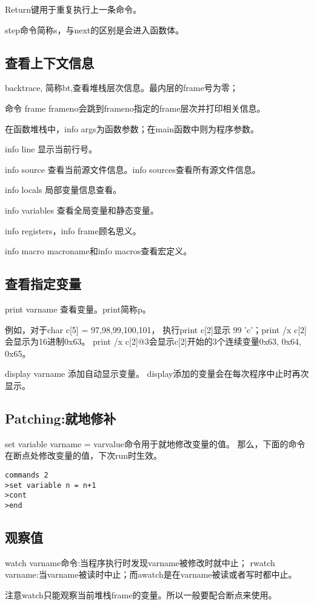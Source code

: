 Return键用于重复执行上一条命令。

step命令简称s，与next的区别是会进入函数体。

\subsection{查看上下文信息}

backtrace, 简称bt,查看堆栈层次信息。最内层的frame号为零；

命令 frame frameno会跳到frameno指定的frame层次并打印相关信息。

在函数堆栈中，info args为函数参数；在main函数中则为程序参数。

info line 显示当前行号。

info source 查看当前源文件信息。info sources查看所有源文件信息。

info locals 局部变量信息查看。

info variables 查看全局变量和静态变量。

info registers，info frame顾名思义。

info macro macroname和info macros查看宏定义。


\subsection{查看指定变量}
print varname 查看变量。print简称p。

例如，对于char c[5] = {97,98,99,100,101}，
执行print c[2]显示 99 'c'；print /x c[2]会显示为16进制0x63。
print /x c[2]@3会显示c[2]开始的3个连续变量{0x63, 0x64, 0x65}。

display varname 添加自动显示变量。
display添加的变量会在每次程序中止时再次显示。

\subsection{Patching:就地修补}
set variable varname = varvalue命令用于就地修改变量的值。
那么，下面的命令在断点处修改变量的值，下次run时生效。
\begin{verbatim}
commands 2
>set variable n = n+1
>cont
>end
\end{verbatim}


\subsection{观察值}
watch varname命令:当程序执行时发现varname被修改时就中止；
rwatch varname:当varname被读时中止；而awatch是在varname被读或者写时都中止。

注意watch只能观察当前堆栈frame的变量。所以一般要配合断点来使用。








































